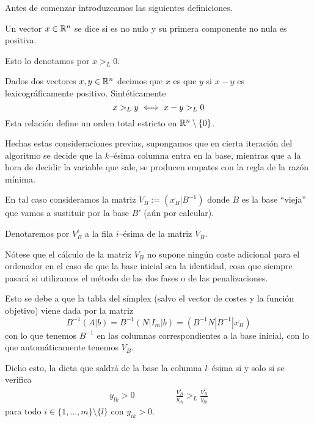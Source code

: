 Antes de comenzar introduzcamos las siguientes definiciones.
\begin{defi}
	Un vector $x\in\mathbb{R}^n$ se dice  si es no nulo y su primera componente no nula es positiva.
	
	Esto lo denotamos por $x>_L0$.
\end{defi}
\begin{defi}
	Dados dos vectores $x,y\in\mathbb{R}^n$ decimos que $x$ es  que $y$ si $x-y$ es lexicográficamente positivo. Sintéticamente
	\begin{equation*}
		x>_Ly\iff x-y>_L0
	\end{equation*}
	Esta relación define un orden total estricto en $\mathbb{R}^n\setminus\{0\}$.
\end{defi}
Hechas estas consideraciones previas, supongamos que en cierta iteración del algoritmo se decide que la $k$--ésima columna entra en la base, mientras que a la hora de decidir la variable que sale, se producen empates con la regla de la razón mínima.

En tal caso consideramos la matriz $V_B:=(\overline{x_B}|B^{-1})$ donde $B$ es la base ``vieja'' que vamos a sustituir por la base $B'$ (aún por calcular).

Denotaremos por $V_B^i$ a la fila $i$--ésima de la matriz $V_B$.
\begin{obs}[Cálculo de $V_B$]
	Nótese que el cálculo de la matriz $V_B$ no supone ningún coste adicional para el ordenador en el caso de que la base inicial sea la identidad, cosa que siempre pasará si utilizamos el método de las dos fases o de las penalizaciones.

	Esto se debe a que la tabla del símplex (salvo el vector de costes y la función objetivo) viene dada por la matriz
	\begin{equation*}
		B^{-1}(A|b)=B^{-1}(N|I_m|b)=(B^{-1}N|B^{-1}|\overline{x_B})
	\end{equation*}
	con lo que tenemos $B^{-1}$ en las columnas correspondientes a la base inicial, con lo que automáticamente tenemos $V_B$.
\end{obs}
Dicho esto, la  dicta que saldrá de la base la columna $l$--ésima si y solo si se verifica
\begin{equation}
\label{simp_eq_lexico}
	\begin{array}{cc}
		y_{lk}>0 \qquad&\qquad \displaystyle{\frac{V_B^i}{y_{ik}}>_L\frac{V_B^l}{y_{lk}}}
	\end{array}
\end{equation}
para todo $i\in\{1,\dots,m\}\setminus\{l\}$ con $y_{ik}>0$.

